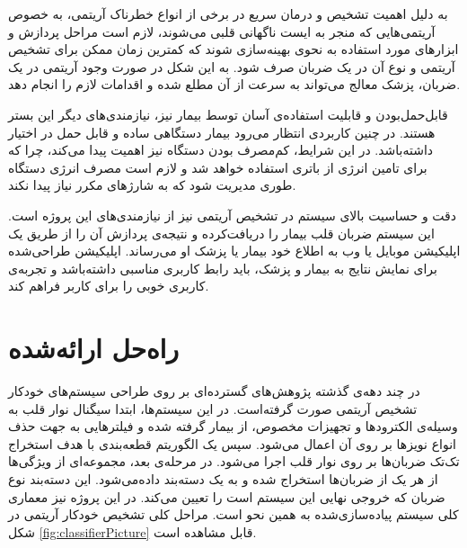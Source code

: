 به دلیل اهمیت تشخیص و درمان سریع در برخی از انواع خطرناک آریتمی، به خصوص آریتمی‌هایی که منجر به ایست ناگهانی قلبی می‌شوند، لازم است مراحل پردازش و ابزارهای مورد استفاده به نحوی بهینه‌سازی شوند که کمترین زمان ممکن برای تشخیص آریتمی و نوع آن در یک ضربان صرف شود. به این شکل در صورت وجود آریتمی در یک ضربان، پزشک معالج می‌تواند به سرعت از آن مطلع شده و اقدامات لازم را انجام دهد.

قابل‌حمل‌بودن و قابلیت استفاده‌ی آسان توسط بیمار نیز، نیازمندی‌های دیگر این بستر هستند. در چنین کاربردی انتظار می‌رود بیمار دستگاهی ساده و قابل حمل در اختیار داشته‌باشد. در این شرایط،  کم‌مصرف بودن دستگاه نیز اهمیت پیدا می‌کند، چرا که برای تامین انرژی از باتری استفاده خواهد شد و لازم است مصرف انرژی دستگاه طوری مدیریت شود که به شارژهای مکرر نیاز پیدا نکند.

دقت و حساسیت بالای سیستم در تشخیص آریتمی نیز از نیازمندی‌های این پروژه است. این سیستم ضربان قلب بیمار را دریافت‌کرده و نتیجه‌ی پردازش آن را از طریق یک اپلیکیشن موبایل یا وب به اطلاع خود بیمار یا پزشک او می‌رساند.  اپلیکیشن طراحی‌شده برای نمایش نتایج به بیمار و پزشک، باید رابط کاربری مناسبی داشته‌باشد و تجربه‌ی کاربری خوبی را برای کاربر فراهم کند. 
 


\section{راه‌حل ارائه‌شده}

در چند دهه‌ی گذشته پژوهش‌های گسترده‌ای بر روی طراحی سیستم‌های خودکار تشخیص آریتمی صورت گرفته‌است. در این سیستم‌ها، ابتدا سیگنال نوار قلب به وسیله‌ی الکترودها و تجهیزات مخصوص، از بیمار گرفته شده و فیلترهایی به جهت حذف انواع نویزها بر روی آن اعمال می‌شود. سپس یک الگوریتم قطعه‌بندی  با هدف استخراج تک‌تک ضربان‌ها بر روی نوار قلب اجرا می‌شود. در مرحله‌ی بعد، مجموعه‌ای از ویژگی‌ها از هر یک از ضربان‌ها استخراج شده و به یک دسته‌بند داده‌می‌شود. این دسته‌بند نوع ضربان که خروجی نهایی این سیستم است را تعیین می‌کند. در این پروژه نیز معماری کلی سیستم پیاد‌ه‌سازی‌شده به همین نحو است. مراحل کلی تشخیص خودکار آریتمی در شکل \ref{fig:classifierPicture} قابل مشاهده است.
 
